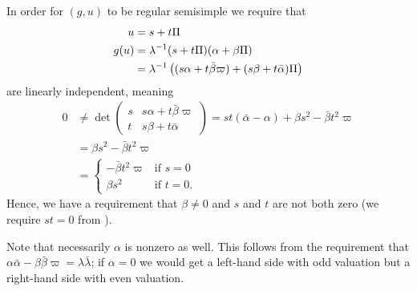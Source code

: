 In order for $(g,u)$ to be regular semisimple we require that
\begin{align*}
  u &= s + t \Pi \\
  g(u) &= \lambda^{-1} (s + t \Pi)(\alpha + \beta \Pi) \\
  &= \lambda^{-1} \left( (s \alpha + t \bar\beta \varpi) + (s \beta + t \bar\alpha)\Pi \right)
\end{align*}
are linearly independent, meaning
\begin{align*}
  0 &\neq
  \det \begin{pmatrix}
    s & s \alpha + t \bar \beta \varpi \\
    t & s \beta + t \bar \alpha
  \end{pmatrix}
  = st(\bar\alpha - \alpha) + \beta s^2 - \bar\beta t^2 \varpi \\
  &= \beta s^2 - \bar\beta t^2 \varpi \\
  &= \begin{cases}
    -\bar\beta t^2 \varpi & \text{if } s = 0 \\
    \beta s^2 & \text{if } t = 0.
  \end{cases}
\end{align*}
Hence, we have a requirement that $\beta \neq 0$
and $s$ and $t$ are not both zero (we require $st = 0$ from ).
\begin{remark}
  Note that necessarily $\alpha$ is nonzero as well.
  This follows from the requirement that
  $\alpha \bar \alpha - \beta \bar \beta \varpi = \lambda \bar\lambda$;
  if $\alpha = 0$ we would get a left-hand side with odd valuation
  but a right-hand side with even valuation.
\end{remark}

